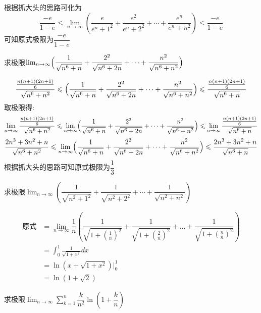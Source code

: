 \documentclass[8pt a4paper, oneside, UTF8]{ctexbook}
\begin{document}
\begin{sloppypar}
\begin{solution}
        根据抓大头的思路可化为
        $$
        \dfrac{-e}{1-e} \leqslant \lim_{n\to\infty}\left(\dfrac{e}{e^{n}+1^{2}}+\dfrac{e^{2}}{e^{n}+2^{2}}+\cdots+\dfrac{e^{n}}{e^{n}+n^{2}}\right) \leqslant \dfrac{-e}{1-e}
        $$
        可知原式极限为$\dfrac{-e}{1-e}$
    \end{solution}
    \begin{problem}
        求极限$\operatorname*{lim}_{n\to\infty}\Bigl(\dfrac{1}{\sqrt{n^{6}+n}}+\dfrac{2^{2}}{\sqrt{n^{6}+2n}}+\cdots+\dfrac{n^{2}}{\sqrt{n^{6}+n^{2}}}\Bigr)$
    \end{problem}
    \begin{solution}
        $$
            \dfrac{\frac{n(n+1)(2n+1)}6}{\sqrt{n^6+n^2}} \leqslant \Bigl(\dfrac{1}{\sqrt{n^{6}+n}}+\dfrac{2^{2}}{\sqrt{n^{6}+2n}}+\cdots+\dfrac{n^{2}}{\sqrt{n^{6}+n^{2}}}\Bigr) \leqslant \dfrac{\frac{n(n+1)(2n+1)}6}{\sqrt{n^6+n}}
        $$
        取极限得:
        $$
        \lim_{n\to\infty} \dfrac{\frac{n(n+1)(2n+1)}6}{\sqrt{n^6+n^2}} \leqslant  \lim_{n\to\infty} \Bigl(\dfrac{1}{\sqrt{n^{6}+n}}+\dfrac{2^{2}}{\sqrt{n^{6}+2n}}+\cdots+\dfrac{n^{2}}{\sqrt{n^{6}+n^{2}}}\Bigr) \leqslant \lim_{n\to\infty} \dfrac{\frac{n(n+1)(2n+1)}6}{\sqrt{n^6+n}}
        $$
        $$
        \dfrac{2n^3+3n^2+n}{\sqrt{n^6+n^2}} \leqslant \lim_{n\to\infty} \Bigl(\dfrac{1}{\sqrt{n^{6}+n}}+\dfrac{2^{2}}{\sqrt{n^{6}+2n}}+\cdots+\dfrac{n^{2}}{\sqrt{n^{6}+n^{2}}}\Bigr) \leqslant \dfrac{2n^3+3n^2+n}{\sqrt{n^6+n}}
        $$
        根据抓大头的思路可知原式极限为$\dfrac{1}{3}$
    \end{solution}
    \begin{problem}
        求极限$\lim_{n\to\infty}\left(\dfrac{1}{\sqrt{n^{2}+1^{2}}}+\dfrac{1}{\sqrt{n^{2}+2^{2}}}+\cdots+\dfrac{1}{\sqrt{n^{2}+n^{2}}}\right)$
    \end{problem}
    \begin{solution}
        \begin{align*}
          \text{原式} & =\lim_{n \to \infty} \dfrac{1}{n}\left(\dfrac{1}{\sqrt{1+(\frac{1}{n})^2}}+\dfrac{1}{\sqrt{1+(\frac{2}{n})^2}}+...+\dfrac{1}{\sqrt{1+(\frac{n}{n})^2}}\right)\\
          & = \int_{0}^{1}\frac{1}{\sqrt{1+x^{2}}}dx\\
          & = \ln (x+\sqrt{1+x^{2}})|_{0}^{1}\\
          & =\ln(1+\sqrt{2})
        \end{align*}
    \end{solution}
    \begin{problem}
        求极限$\lim_{n\to\infty}\sum_{k=1}^n\dfrac{k}{n^2}\ln\left(1+\dfrac{k}{n}\right)$

\end{problem}
\end{sloppypar}
\end{document}
